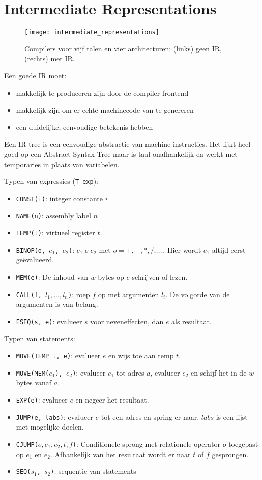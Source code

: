 
\chapter{Intermediate Representations}
\begin{figure}[ht]
	\texttt{[image: intermediate\_representations]}
	\caption{Compilers voor vijf talen en vier architecturen: 
		(links) geen IR, (rechts) met IR.}
	\label{fig:intermediate_representations}
\end{figure}
Een goede IR moet:
\begin{itemize}
	\item makkelijk te produceren zijn door de compiler frontend
	\item makkelijk zijn om er echte machinecode van te genereren
	\item een duidelijke, eenvoudige betekenis hebben
\end{itemize}

Een IR-tree is een eenvoudige abstractie van machine-instructies. Het lijkt heel goed op een Abstract Syntax Tree maar is taal-onafhankelijk en werkt met temporaries in plaats van variabelen.

Typen van expressies (\texttt{T\_exp}):
\begin{itemize}
	\item \texttt{CONST(i)}: integer constante $i$
	\item \texttt{NAME(n)}: assembly label $n$
	\item \texttt{TEMP(t)}: virtueel register $t$
	\item \texttt{BINOP(o, $e_1$, $e_2$)}: $e_1\;o\;e_2$ met $o = +, -, *, /, ...$. Hier wordt $e_1$ altijd eerst geëvalueerd.
	\item \texttt{MEM(e)}: De inhoud van $w$ bytes op $e$ schrijven of lezen.
	\item \texttt{CALL(f, $l_1, ..., l_n$)}: roep $f$ op met argumenten $l_i$. De volgorde van de argumenten is van belang.
	\item \texttt{ESEQ(s, e)}: evalueer $s$ voor neveneffecten, dan $e$ als resultaat.
\end{itemize}

Typen van statements:
\begin{itemize}
	\item \texttt{MOVE(TEMP t, e)}: evalueer $e$ en wijs toe aan temp $t$.
	\item \texttt{MOVE(MEM($e_1$), $e_2$)}: evalueer $e_1$ tot adres $a$, evalueer $e_2$ en schijf het in de $w$ bytes vanaf $a$.
	\item \texttt{EXP(e)}: evalueer $e$ en negeer het resultaat.
	\item \texttt{JUMP(e, labs)}: evalueer $e$ tot een adres en spring er naar. $labs$ is een lijst met mogelijke doelen.
	\item \texttt{CJUMP($o, e_1, e_2, t, f$)}: Conditionele sprong met relationele operator $o$ toegepast op $e_1$ en $e_2$. Afhankelijk van het resultaat wordt er naar $t$ of $f$ gesprongen.
	\item \texttt{SEQ($s_1$, $s_2$)}: sequentie van statements 
\end{itemize}


